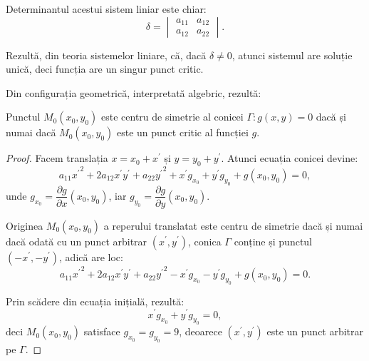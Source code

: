 Determinantul acestui sistem liniar este chiar: 
 \[
	\delta = \begin{vmatrix}
	             a_{11} & a_{12} \\
	             a_{12} & a_{22}
             \end{vmatrix}.
\]

Rezultă, din teoria sistemelor liniare, că, dacă $\delta \neq 0$, atunci 
sistemul are soluție unică, deci funcția are un singur punct critic.

Din configurația geometrică, interpretată algebric, rezultă:

\begin{theorem}
	Punctul $M_0(x_0, y_0)$ este centru de simetrie al conicei 
$\Gamma : g(x, y) = 0$ dacă și numai dacă $M_0(x_0, y_0)$ este un punct critic
al funcției $g$.
\end{theorem}

\begin{proof}
	Facem translația $x = x_0 + x^{\prime}$ și $y = y_0 + y^{\prime}$. Atunci
ecuația conicei devine: 
 \[
	a_{11} {x^{\prime}}^2 + 2a_{12}x^{\prime}y^{\prime} + a_{22} {y^{\prime}}^2
	+ x^{\prime}g_{x_0} + y^{\prime} g_{y_0} + g(x_0, y_0) = 0,
\]
unde $g_{x_0} = \dfrac{\partial g}{\partial x}(x_0, y_0)$, iar
$g_{y_0} = \dfrac{\partial g}{\partial y}(x_0, y_0)$.

Originea $M_0(x_0, y_0)$ a reperului translatat este centru de simetrie dacă
și numai dacă odată cu un punct arbitrar $(x^{\prime}, y^{\prime})$, conica
$\Gamma$ conține și punctul $(-x^{\prime}, -y^{\prime})$, adică are loc: 
 \[
	a_{11} {x^{\prime}}^2 + 2a_{12} x^{\prime} y^{\prime} + a_{22}{y^{\prime}}^2
	- x^{\prime}g_{x_0} - y^{\prime} g_{y_0} + g(x_0, y_0) = 0.
\]

Prin scădere din ecuația inițială, rezultă: 
 \[
	x^{\prime}g_{x_0} + y^{\prime} g_{y_0} = 0,
\]
deci $M_0(x_0, y_0)$ satisface $g_{x_0} = g_{y_0} = 9$, deoarece $(x^{\prime},
y^{\prime})$ este un punct arbitrar pe $\Gamma$.
\end{proof}

